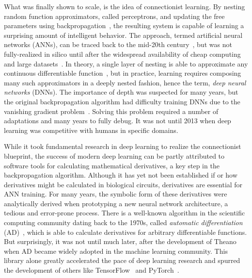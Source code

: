 \documentclass[12pt,initial,twoside,maitrise]{dms}
\numberwithin{equation}{section}
\numberwithin{table}{chapter}
\numberwithin{figure}{chapter}
\begin{document}
What was finally shown to scale, is the idea of connectionist learning. By nesting random function approximators, called perceptrons, and updating the free parameters using backpropagation~\citep{werbos1990backpropagation, rumelhart1988learning}, the resulting system is capable of learning a surprising amount of intelligent behavior. The approach, termed artificial neural networks (ANNs), can be traced back to the mid-20th century~\citep{ivakhnenko1965cybernetic, rosenblatt1958perceptron}, but was not fully-realized in silico until after the widespread availability of cheap computing and large datasets~\citep{lecun2015deep}. In theory, a single layer of nesting is able to approximate any continuous differentiable function~\citep{hornik1989multilayer}, but in practice, learning requires composing many such approximators in a deeply nested fashion, hence the term, \textit{deep neural networks} (DNNs). The importance of depth was suspected for many years, but the original backpropagation algorithm had difficulty training DNNs due to the vanishing gradient problem~\citep{bengio1994learning}. Solving this problem required a number of adaptations and many years to fully debug. It was not until 2013 when deep learning was competitive with humans in specific domains.

While it took fundamental research in deep learning to realize the connectionist blueprint, the success of modern deep learning can be partly attributed to software tools for calculating mathematical derivatives, a key step in the backpropagation algorithm. Although it has yet not been established if or how derivatives might be calculated in biological circuits, derivatives are essential for ANN training. For many years, the symbolic form of these derivatives were analytically derived when prototyping a new neural network architecture, a tedious and error-prone process. There is a well-known algorithm in the scientific computing community dating back to the 1970s, called \textit{automatic differentiation} (AD)~\citep{linnainmaa1970representation, griewank1989automatic}, which is able to calculate derivatives for arbitrary differentiable functions. But surprisingly, it was not until much later, after the development of Theano~\citep{bergstra2010theano} when AD became widely adopted in the machine learning community. This library alone greatly accelerated the pace of deep learning research and spurred the development of others like TensorFlow~\citep{abadi2016tensorflow} and PyTorch~\citep{paszke2017automatic}.
\end{document}
